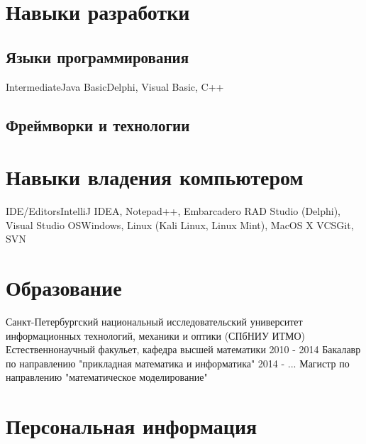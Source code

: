 \documentclass[11pt,a4paper,russian]{moderncv}
\begin{document}
\section{Навыки разработки}
\subsection{Языки программирования}
\cvline
  {Intermediate}{Java}
\cvline
  {Basic}{Delphi, Visual Basic, C++}
\subsection{Фреймворки и технологии}
\newpage

\section{Навыки владения компьютером}
  \cvline
  {IDE/Editors}{IntelliJ IDEA, Notepad++, Embarcadero RAD Studio (Delphi), Visual Studio}
  \cvline
  {OS}{Windows, Linux (Kali Linux, Linux Mint), MacOS X}
  \cvline
  {VCS}{Git, SVN}

\section{Образование}
  \cventry
    {}
    {\textnormal{Санкт-Петербургский национальный исследовательский университет информационных технологий, механики и оптики}{ (СПбНИУ ИТМО)}}
    {\textnormal{Естественнонаучный факульет, кафедра высшей математики}}
    {}{}{}
  \cventry
    {2010 - 2014}
    {\textnormal{Бакалавр по направлению "прикладная математика и информатика"}}
    {}{}{}{}
  \cventry
    {2014 - ...}
    {\textnormal{Магистр по направлению "математическое моделирование"}}
    {}{}{}{}
\section{Персональная информация}
\end{document}
